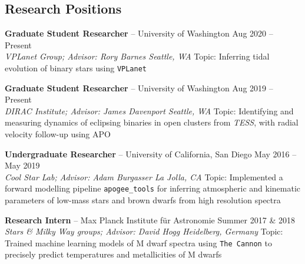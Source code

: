 \documentclass[margin,line]{resume}
\begin{document}
\begin{resume}

\section{\mysidestyle \textcolor{bcolor}{Research Positions}}

\textbf{Graduate Student Researcher} -- University of Washington \hfill Aug 2020 -- Present \\
\textsl{VPLanet Group; Advisor: Rory Barnes \hfill Seattle, WA} 
\vspace{.1cm} \newline
Topic: Inferring tidal evolution of binary stars using \texttt{VPLanet}

\textbf{Graduate Student Researcher} -- University of Washington \hfill Aug 2019 -- Present \\
\textsl{DIRAC Institute; Advisor: James Davenport \hfill Seattle, WA} 
\vspace{.1cm} \newline
Topic: Identifying and measuring dynamics of eclipsing binaries in open clusters from \textsl{TESS}, with radial velocity follow-up using APO

\textbf{Undergraduate Researcher} -- University of California, San Diego \hfill May 2016 -- May 2019  \\
\textsl{Cool Star Lab; Advisor: Adam Burgasser \hfill La Jolla, CA} 
\vspace{.1cm} \newline
Topic: Implemented a forward modelling pipeline \texttt{apogee\_tools} for inferring atmospheric and kinematic parameters of low-mass stars and brown dwarfs from high resolution spectra

\textbf{Research Intern} -- Max Planck Institute f{\"u}r Astronomie \hfill Summer 2017 \& 2018 \\
\textsl{Stars \& Milky Way groups; Advisor: David Hogg \hfill Heidelberg, Germany} 
\vspace{.1cm} \newline
Topic: Trained machine learning models of M dwarf spectra using \texttt{The Cannon} to precisely predict temperatures and metallicities of M dwarfs



\end{resume}
\end{document}
